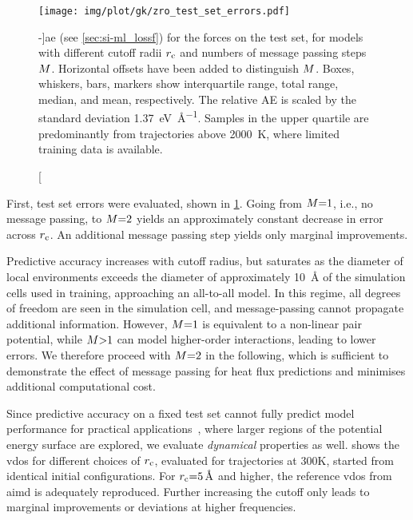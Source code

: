 \begin{figure}
  \texttt{[image: img/plot/gk/zro\_test\_set\_errors.pdf]}
  \caption[][-\baselineskip]{\Gls{ae} (see \cref{sec:si-ml_lossf}) for the forces on the test set, for models with different cutoff radii $r_{\text{c}}$ and numbers of message passing steps $M$. Horizontal offsets have been added to distinguish $M$.
  Boxes, whiskers, bars, markers show interquartile range, total range, median, and mean, respectively.
  The relative AE is scaled by the standard deviation \qty{1.37}{eV\per\angstrom}.
  Samples in the upper quartile are predominantly from trajectories above \qty{2000}{K}, where limited training data is available.
  }
  \label{fig:gkm_test_set_errors}
\end{figure}

\noindent
First, test set errors were evaluated, shown in \cref{fig:gkm_test_set_errors}. Going from $M{=}1$, i.e., no message passing, to $M{=}2$ yields an approximately constant decrease in error across $r_{\text{c}}$. An additional message passing step yields only marginal improvements.

Predictive accuracy increases with cutoff radius, but saturates as the diameter of local environments exceeds the diameter of approximately \SI{10}{\angstrom} of the simulation cells used in training, approaching an all-to-all model. In this regime, all degrees of freedom are seen in the simulation cell, and message-passing cannot propagate additional information. However, $M{=}1$ is equivalent to a non-linear pair potential, while $M{>}1$ can model higher-order interactions, leading to lower errors. We therefore proceed with $M{=}2$ in the following, which is sufficient to demonstrate the effect of message passing for heat flux predictions and minimises additional computational cost.


Since predictive accuracy on a fixed test set cannot fully predict model performance for practical applications~\cite{fwgj2022a}, where larger regions of the potential energy surface are explored, we evaluate \emph{dynamical} properties as well.  shows the \gls{vdos} for different choices of $r_{\text{c}}$, evaluated for trajectories at \si{300}{K}, started from identical initial configurations. For $r_{\text{c}}{=}\SI{5}{\angstrom}$ and higher, the reference \gls{vdos} from \gls{aimd} is adequately reproduced. Further increasing the cutoff only leads to marginal improvements or deviations at higher frequencies.


